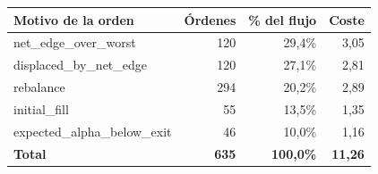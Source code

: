 \begin{tabular}{lrrr}
\toprule
Motivo de la orden & Órdenes & \% del flujo & Coste \\
\midrule
net\_edge\_over\_worst & 120 & 29,4\% & 3,05 \\
displaced\_by\_net\_edge & 120 & 27,1\% & 2,81 \\
rebalance & 294 & 20,2\% & 2,89 \\
initial\_fill & 55 & 13,5\% & 1,35 \\
expected\_alpha\_below\_exit & 46 & 10,0\% & 1,16 \\
\textbf{Total} & \textbf{635} & \textbf{100,0\%} & \textbf{11,26} \\
\bottomrule
\end{tabular}
